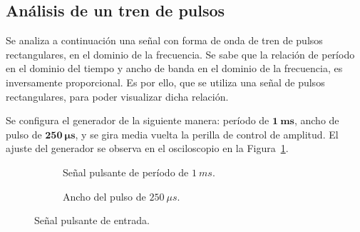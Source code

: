   \subsection{Análisis de un tren de pulsos}

    Se analiza a continuación una señal con forma de onda de tren de pulsos rectangulares, en el dominio 
    de la frecuencia.
    Se sabe que la relación de período en el dominio del tiempo y ancho de banda en el dominio de la frecuencia, 
    es inversamente proporcional. Es por ello, que se utiliza una señal de pulsos rectangulares, para poder visualizar 
    dicha relación.

    Se configura el generador de la siguiente manera: período de $\mathbf{1~ms}$, ancho de pulso de 
    $\mathbf{250~} \boldsymbol{\mu} \mathbf{s}$, y se gira media vuelta la perilla de control de amplitud.
    El ajuste del generador se observa en el osciloscopio en la Figura~\ref{fig:Exp2SeñalPulso}.

      \begin{figure}[H]
        \centering
        \begin{subfigure}[H]{0.48\textwidth}
          \caption{Señal pulsante de período de $1~ms$.}
        \end{subfigure}
        \hfill
        \begin{subfigure}[H]{0.48\textwidth}
          \caption{Ancho del pulso de $250~\mu s$.}
        \end{subfigure}

        \caption{Señal pulsante de entrada.}
        \label{fig:Exp2SeñalPulso}
      \end{figure}

